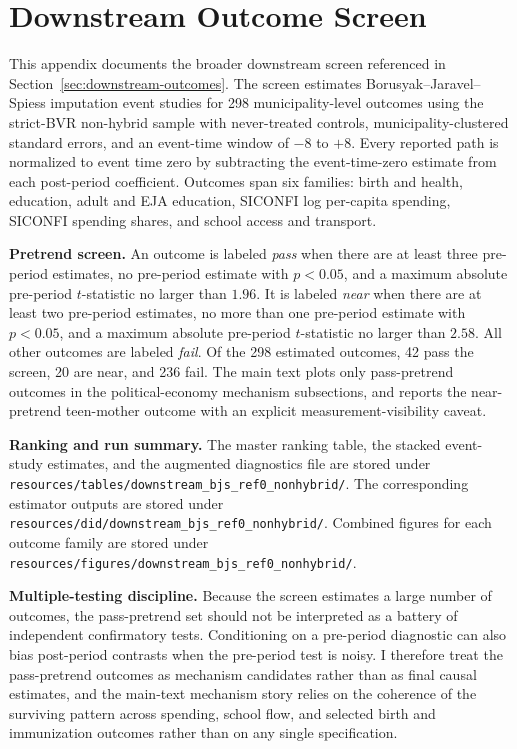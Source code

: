\section{Downstream Outcome Screen}
\label{app:downstream-screen}

This appendix documents the broader downstream screen referenced in Section~\ref{sec:downstream-outcomes}. The screen estimates Borusyak--Jaravel--Spiess imputation event studies for 298 municipality-level outcomes using the strict-BVR non-hybrid sample with never-treated controls, municipality-clustered standard errors, and an event-time window of $-8$ to $+8$. Every reported path is normalized to event time zero by subtracting the event-time-zero estimate from each post-period coefficient. Outcomes span six families: birth and health, education, adult and EJA education, SICONFI log per-capita spending, SICONFI spending shares, and school access and transport.

\textbf{Pretrend screen.} An outcome is labeled \emph{pass} when there are at least three pre-period estimates, no pre-period estimate with $p<0.05$, and a maximum absolute pre-period $t$-statistic no larger than $1.96$. It is labeled \emph{near} when there are at least two pre-period estimates, no more than one pre-period estimate with $p<0.05$, and a maximum absolute pre-period $t$-statistic no larger than $2.58$. All other outcomes are labeled \emph{fail}. Of the 298 estimated outcomes, 42 pass the screen, 20 are near, and 236 fail. The main text plots only pass-pretrend outcomes in the political-economy mechanism subsections, and reports the near-pretrend teen-mother outcome with an explicit measurement-visibility caveat.

\textbf{Ranking and run summary.} The master ranking table, the stacked event-study estimates, and the augmented diagnostics file are stored under \texttt{resources/tables/downstream\_bjs\_ref0\_nonhybrid/}. The corresponding estimator outputs are stored under \texttt{resources/did/downstream\_bjs\_ref0\_nonhybrid/}. Combined figures for each outcome family are stored under \texttt{resources/figures/downstream\_bjs\_ref0\_nonhybrid/}.

\textbf{Multiple-testing discipline.} Because the screen estimates a large number of outcomes, the pass-pretrend set should not be interpreted as a battery of independent confirmatory tests. Conditioning on a pre-period diagnostic can also bias post-period contrasts when the pre-period test is noisy. I therefore treat the pass-pretrend outcomes as mechanism candidates rather than as final causal estimates, and the main-text mechanism story relies on the coherence of the surviving pattern across spending, school flow, and selected birth and immunization outcomes rather than on any single specification.
